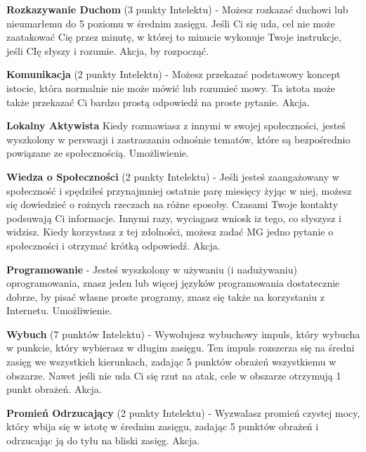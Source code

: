 {\textbf{Rozkazywanie Duchom}\label{sec:Rozkazywanie Duchom} (3 punkty Intelektu) - Możesz rozkazać duchowi lub nieumarłemu do 5 poziomu w średnim zasięgu. Jeśli Ci się uda, cel nie może zaatakować Cię przez minutę, w której to minucie wykonuje Twoje instrukcje, jeśli CIę słyszy i rozumie. Akcja, by rozpocząć.

\textbf{Komunikacja}\label{sec:Komunikacja}  (2 punkty Intelektu) - Możesz przekazać podstawowy koncept istocie, która normalnie nie może mówić lub rozumieć mowy. Ta istota może także przekazać Ci bardzo prostą odpowiedź na proste pytanie. Akcja.

\textbf{Lokalny Aktywista}\label{sec:Lokalny Aktywista} Kiedy rozmawiasz z innymi w swojej społeczności, jesteś wyszkolony w perswazji i zastraszaniu odnośnie tematów, które są bezpośrednio powiązane ze społecznością. Umożliwienie.

\textbf{Wiedza o Społeczności}\label{sec:Wiedza o Społeczności} (2 punkty Intelektu) - Jeśli jesteś zaangażowany w społeczność i spędziłeś przynajmniej ostatnie parę miesięcy żyjąc w niej, możesz się dowiedzieć o rożnych rzeczach na różne sposoby. Czasami Twoje kontakty podsuwają Ci informacje. Innymi razy, wyciagasz wniosk iz tego, co słyszysz i widzisz. Kiedy korzystasz z tej zdolności, możesz zadać MG jedno pytanie o społeczności i otrzymać krótką odpowiedź. Akcja.

\textbf{Programowanie}\label{sec:Programowanie} - Jesteś wyszkolony w używaniu (i nadużywaniu) oprogramowania, znasz jeden lub więcej języków programowania dostatecznie dobrze, by pisać własne proste programy, znasz się także na korzystaniu z Internetu. Umożliwienie. 

\textbf{Wybuch}\label{sec:Wybuch} (7 punktów Intelektu) - Wywołujesz wybuchowy impuls, który wybucha w punkcie, który wybierasz w długim zasięgu. Ten impuls rozszerza się na średni zasięg we wszystkich kierunkach, zadając 5 punktów obrażeń wszystkiemu w obszarze. Nawet jeśli nie uda Ci się rzut na atak, cele w obszarze otrzymują 1 punkt obrażeń. Akcja.

\textbf{Promień Odrzucający}\label{sec:Promień Odrzucający} (2 punkty Intelektu) - Wyzwalasz promień czystej mocy, który wbija się w istotę w średnim zasięgu, zadając 5 punktów obrażeń i odrzucając ją do tyłu na bliski zasięg. Akcja.

}
